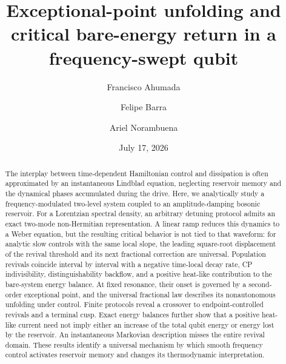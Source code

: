 \documentclass[reprint,superscriptaddress,floatfix,amsmath,amssymb,prresearch,aps]{revtex4-2}
\begin{document}
\title{Exceptional-point unfolding and critical bare-energy return in a
frequency-swept qubit}

\author{Francisco Ahumada}

\author{Felipe Barra}

\author{Ariel Norambuena}

\date{July 17, 2026}

\begin{abstract}
The interplay between time-dependent Hamiltonian control and dissipation is often approximated by an instantaneous Lindblad equation, neglecting reservoir memory and the dynamical phases accumulated during the drive. Here, we analytically study a frequency-modulated two-level system coupled to an amplitude-damping bosonic reservoir. For a Lorentzian spectral density, an arbitrary detuning protocol admits an exact two-mode non-Hermitian representation. A linear ramp reduces this dynamics to a Weber equation, but the resulting critical behavior is not tied to that waveform: for analytic slow controls with the same local slope, the leading square-root displacement of the revival threshold and its next fractional correction are universal. Population revivals coincide interval by interval with a negative time-local decay rate, CP indivisibility, distinguishability backflow, and a positive heat-like contribution to the bare-system energy balance. At fixed resonance, their onset is governed by a second-order exceptional point, and the universal fractional law describes its nonautonomous unfolding under control. Finite protocols reveal a crossover to endpoint-controlled revivals and a terminal cusp. Exact energy balances further show that a positive heat-like current need not imply either an increase of the total qubit energy or energy lost by the reservoir. An instantaneous Markovian description misses the entire revival domain. These results identify a universal mechanism by which smooth frequency control activates reservoir memory and changes its thermodynamic interpretation.
\end{abstract}

\maketitle
\end{document}
